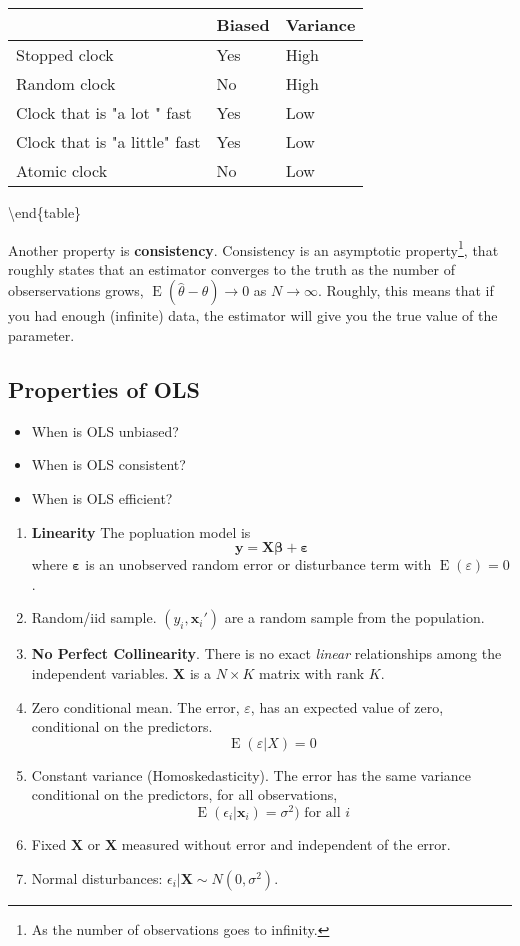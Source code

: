 \documentclass[]{book}
\providecommand{\tightlist}{%
  \setlength{\itemsep}{0pt}\setlength{\parskip}{0pt}}
\let\rmarkdownfootnote\footnote%
\def\footnote{\protect\rmarkdownfootnote}
\DeclareMathOperator{\E}{E}
\newcommand{\mat}[1]{\boldsymbol{#1}}
\renewcommand{\vec}[1]{\boldsymbol{#1}}
\begin{document}
\begin{tabular}[t]{l|l|l}
\hline
  & Biased & Variance\\
\hline
Stopped clock & Yes & High\\
\hline
Random clock & No & High\\
\hline
Clock that is "a lot " fast & Yes & Low\\
\hline
Clock that is "a little" fast & Yes & Low\\
\hline
Atomic clock & No & Low\\
\hline
\end{tabular}

\textbackslash{}end\{table\}

Another property is \textbf{consistency}. Consistency is an asymptotic
property\footnote{As the number of observations goes to infinity.}, that
roughly states that an estimator converges to the truth as the number of
obserservations grows, \(\E(\hat\theta - \theta) \to 0\) as
\(N \to \infty\). Roughly, this means that if you had enough (infinite)
data, the estimator will give you the true value of the parameter.

\subsection{Properties of OLS}\label{properties-of-ols}

\begin{itemize}
\tightlist
\item
  When is OLS unbiased?
\item
  When is OLS consistent?
\item
  When is OLS efficient?
\end{itemize}

\begin{enumerate}
\def\labelenumi{\arabic{enumi}.}
\item
  \textbf{Linearity} The popluation model is \[
     \vec{y} = \mat{X} \vec{\beta} + \vec{\varepsilon}
     \] where \(\vec{\varepsilon}\) is an unobserved random error or
  disturbance term with \(\E(\varepsilon) = 0\).
\item
  Random/iid sample. \((y_i, \vec{x}_i')\) are a random sample from the
  population.
\item
  \textbf{No Perfect Collinearity}. There is no exact \emph{linear}
  relationships among the independent variables. \(\mat{X}\) is a
  \(N \times K\) matrix with rank \(K\).
\item
  Zero conditional mean. The error, \(\varepsilon\), has an expected
  value of zero, conditional on the predictors. \[
  \E(\varepsilon | X) = 0
  \]
\item
  Constant variance (Homoskedasticity). The error has the same variance
  conditional on the predictors, for all observations, \[
  \E(\epsilon_i | \vec{x}_i) = \sigma^2) \text{ for all $i$}
  \]
\item
  Fixed \(\mat{X}\) or \(\mat{X}\) measured without error and
  independent of the error.
\item
  Normal disturbances: \(\epsilon_i|\mat{X} \sim N(0, \sigma^2)\).
\end{enumerate}
\end{document}
